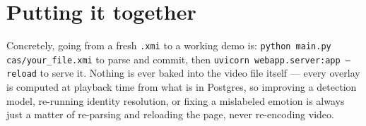 \documentclass[11pt]{article}
\begin{document}
\section{Putting it together}

Concretely, going from a fresh \texttt{.xmi} to a working demo is:
\texttt{python main.py cas/your\_file.xmi} to parse and commit, then
\texttt{uvicorn webapp.server:app --reload} to serve it. Nothing is ever
baked into the video file itself --- every overlay is computed at playback
time from what is in Postgres, so improving a detection model, re-running
identity resolution, or fixing a mislabeled emotion is always just a matter
of re-parsing and reloading the page, never re-encoding video.
\end{document}
